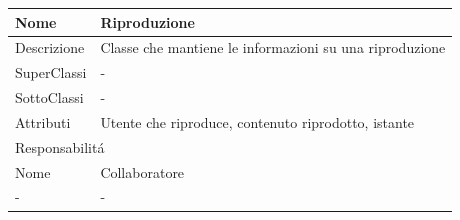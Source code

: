 \begin{center}
    \begin{tabular}{ |p{3cm}|p{3cm}|p{3cm}|p{3cm}| }
        \hline
        Nome & \multicolumn{3}{|p{9cm}|}{Riproduzione} \\\hline
        Descrizione & \multicolumn{3}{|p{9cm}|}{Classe che mantiene le informazioni su una riproduzione} \\\hline
        SuperClassi & \multicolumn{3}{|p{9cm}|}{-} \\\hline
        SottoClassi & \multicolumn{3}{|p{9cm}|}{-} \\\hline
        Attributi & \multicolumn{3}{|p{9cm}|}{Utente che riproduce, contenuto riprodotto, istante} \\\hline
        \multicolumn{4}{|p{12cm}|}{Responsabilit\'a} \\\hline
        \multicolumn{2}{|p{6cm}|}{Nome} & \multicolumn{2}{|p{6cm}|}{Collaboratore} \\\hline
        \multicolumn{2}{|p{6cm}|}{-} & \multicolumn{2}{|p{6cm}|}{-} \\\hline
    \end{tabular}
\end{center}

